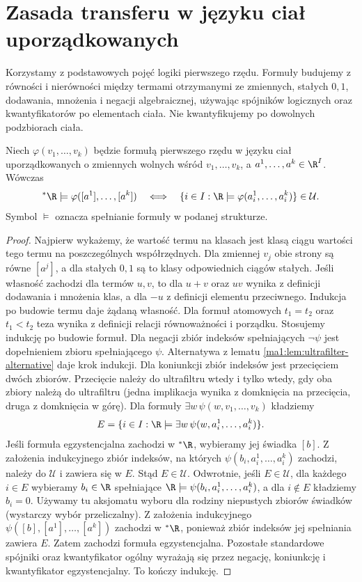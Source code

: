 \section{Zasada transferu w języku ciał uporządkowanych}
\label{ma1:sec:transfer}
Korzystamy z podstawowych pojęć logiki pierwszego rzędu. Formuły budujemy z równości i nierówności między termami otrzymanymi ze zmiennych, stałych $0,1$, dodawania, mnożenia i negacji algebraicznej, używając spójników logicznych oraz kwantyfikatorów po elementach ciała. Nie kwantyfikujemy po dowolnych podzbiorach ciała.
\begin{twierdzenie}
\label{ma1:thm:transfer}
Niech $\varphi(v_1,\ldots,v_k)$ będzie formułą pierwszego rzędu w języku ciał uporządkowanych o zmiennych wolnych wśród $v_1,\ldots,v_k$, a $a^1,\ldots,a^k\in\R^I$. Wówczas
\[
 {}^*\R\models\varphi([a^1],\ldots,[a^k])
 \quad\Longleftrightarrow\quad
 \{i\in I:\R\models\varphi(a^1_i,\ldots,a^k_i)\}\in\mathcal U.
\]
Symbol $\models$ oznacza spełnianie formuły w podanej strukturze.
\end{twierdzenie}
\begin{proof}
Najpierw wykażemy, że wartość termu na klasach jest klasą ciągu wartości tego termu na poszczególnych współrzędnych. Dla zmiennej $v_j$ obie strony są równe $[a^j]$, a dla stałych $0,1$ są to klasy odpowiednich ciągów stałych. Jeśli własność zachodzi dla termów $u,v$, to dla $u+v$ oraz $uv$ wynika z definicji dodawania i mnożenia klas, a dla $-u$ z definicji elementu przeciwnego. Indukcja po budowie termu daje żądaną własność. Dla formuł atomowych $t_1=t_2$ oraz $t_1<t_2$ teza wynika z definicji relacji równoważności i porządku. Stosujemy indukcję po budowie formuł.
Dla negacji zbiór indeksów spełniających $\neg\psi$ jest dopełnieniem zbioru spełniającego $\psi$. Alternatywa z lematu \ref{ma1:lem:ultrafilter-alternative} daje krok indukcji. Dla koniunkcji zbiór indeksów jest przecięciem dwóch zbiorów. Przecięcie należy do ultrafiltru wtedy i tylko wtedy, gdy oba zbiory należą do ultrafiltru (jedna implikacja wynika z domknięcia na przecięcia, druga z domknięcia w górę).
Dla formuły $\exists w\,\psi(w,v_1,\ldots,v_k)$ kładziemy
\[
 E=\{i\in I:\R\models\exists w\,\psi(w,a_i^1,\ldots,a_i^k)\}.
\] Jeśli formuła egzystencjalna zachodzi w $\mathord{}^*\R$, wybieramy jej świadka $[b]$. Z założenia indukcyjnego zbiór indeksów, na których $\psi(b_i,a^1_i,\ldots,a^k_i)$ zachodzi, należy do $\mathcal U$ i zawiera się w $E$. Stąd $E\in\mathcal U$.
Odwrotnie, jeśli $E\in\mathcal U$, dla każdego $i\in E$ wybieramy $b_i\in\R$ spełniające $\R\models\psi(b_i,a_i^1,\ldots,a_i^k)$, a dla $i\notin E$ kładziemy $b_i=0$. Używamy tu aksjomatu wyboru dla rodziny niepustych zbiorów świadków (wystarczy wybór przeliczalny). Z założenia indukcyjnego $\psi([b],[a^1],\ldots,[a^k])$ zachodzi w $\mathord{}^*\R$, ponieważ zbiór indeksów jej spełniania zawiera $E$. Zatem zachodzi formuła egzystencjalna.
Pozostałe standardowe spójniki oraz kwantyfikator ogólny wyrażają się przez negację, koniunkcję i kwantyfikator egzystencjalny. To kończy indukcję.
\end{proof}
